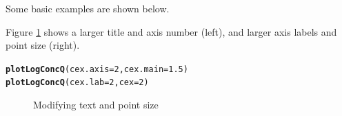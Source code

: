 \documentclass[a4paper,11pt]{article}\usepackage{graphicx, color}
\makeatletter
\newcommand{\hlfunctioncall}[1]{\textcolor[rgb]{0.501960784313725,0,0.329411764705882}{\textbf{#1}}}%
\newenvironment{kframe}{%
 \def\at@end@of@kframe{}%
 \ifinner\ifhmode%
  \def\at@end@of@kframe{\end{minipage}}%
  \begin{minipage}{\columnwidth}%
 \fi\fi%
 \def\FrameCommand##1{\hskip\@totalleftmargin \hskip-\fboxsep
 \colorbox{shadecolor}{##1}\hskip-\fboxsep
     \hskip-\linewidth \hskip-\@totalleftmargin \hskip\columnwidth}%
 \MakeFramed {\advance\hsize-\width
   \@totalleftmargin\z@ \linewidth\hsize
   \@setminipage}}%
 {\par\unskip\endMakeFramed%
 \at@end@of@kframe}
\newenvironment{knitrout}{}{} %
\makeatother
\begin{document}
Some basic examples are shown below.

Figure \ref{fig:adjustSize} shows a larger title and axis number (left), and larger axis labels and point size (right).
\begin{knitrout}
\color{fgcolor}\begin{kframe}
\begin{alltt}
\hlfunctioncall{plotLogConcQ}(cex.axis=2,cex.main=1.5)
\hlfunctioncall{plotLogConcQ}(cex.lab=2,cex=2)
\end{alltt}
\end{kframe}\begin{figure}[]
\caption[Modifying text and point size]{Modifying text and point size\label{fig:adjustSize}}
\end{figure}


\end{knitrout}
\end{document}
